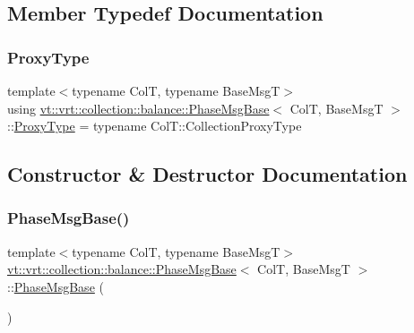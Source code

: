 \subsection{Member Typedef Documentation}
\mbox{\label{structvt_1_1vrt_1_1collection_1_1balance_1_1_phase_msg_base_a21c9d10c5a8d1386f4e0a1bfa04f482f}} 
\subsubsection{\texorpdfstring{Proxy\+Type}{ProxyType}}
{\footnotesize\ttfamily template$<$typename ColT, typename Base\+MsgT$>$ \\
using \hyperlink{structvt_1_1vrt_1_1collection_1_1balance_1_1_phase_msg_base}{vt\+::vrt\+::collection\+::balance\+::\+Phase\+Msg\+Base}$<$ ColT, Base\+MsgT $>$\+::\hyperlink{structvt_1_1vrt_1_1collection_1_1balance_1_1_phase_msg_base_a21c9d10c5a8d1386f4e0a1bfa04f482f}{Proxy\+Type} =  typename Col\+T\+::\+Collection\+Proxy\+Type}



\subsection{Constructor \& Destructor Documentation}
\mbox{\label{structvt_1_1vrt_1_1collection_1_1balance_1_1_phase_msg_base_a6dc4fc0633d31368deae1da80cdb9093}} 
\subsubsection{\texorpdfstring{Phase\+Msg\+Base()}{PhaseMsgBase()}\hspace{0.1cm}{\footnotesize\ttfamily [1/2]}}
{\footnotesize\ttfamily template$<$typename ColT, typename Base\+MsgT$>$ \\
\hyperlink{structvt_1_1vrt_1_1collection_1_1balance_1_1_phase_msg_base}{vt\+::vrt\+::collection\+::balance\+::\+Phase\+Msg\+Base}$<$ ColT, Base\+MsgT $>$\+::\hyperlink{structvt_1_1vrt_1_1collection_1_1balance_1_1_phase_msg_base}{Phase\+Msg\+Base} (\begin{DoxyParamCaption}{ }\end{DoxyParamCaption})\hspace{0.3cm}{\ttfamily [default]}}

